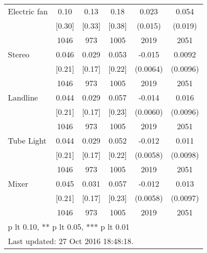 \begin{table}[htbp]
\begin{tabular*}{0.9\hsize}{@{\hskip\tabcolsep\extracolsep\fill}l*{1}{ccccc}}
Electric fan                    &     0.10&     0.13&     0.18&    0.023         &    0.054\sym{***}\\
                                &   [0.30]&   [0.33]&   [0.38]&  (0.015)         &  (0.019)         \\
                                &     1046&      973&     1005&     2019         &     2051         \\
Stereo                          &    0.046&    0.029&    0.053&   -0.015\sym{**} &   0.0092         \\
                                &   [0.21]&   [0.17]&   [0.22]& (0.0064)         & (0.0096)         \\
                                &     1046&      973&     1005&     2019         &     2051         \\
Landline                        &    0.044&    0.029&    0.057&   -0.014\sym{**} &    0.016         \\
                                &   [0.21]&   [0.17]&   [0.23]& (0.0060)         & (0.0096)         \\
                                &     1046&      973&     1005&     2019         &     2051         \\
Tube Light                      &    0.044&    0.029&    0.052&   -0.012\sym{**} &    0.011         \\
                                &   [0.21]&   [0.17]&   [0.22]& (0.0058)         & (0.0098)         \\
                                &     1046&      973&     1005&     2019         &     2051         \\
Mixer                           &    0.045&    0.031&    0.057&   -0.012\sym{**} &    0.013         \\
                                &   [0.21]&   [0.17]&   [0.23]& (0.0058)         & (0.0097)         \\
                                &     1046&      973&     1005&     2019         &     2051         \\
\bottomrule
\multicolumn{6}{l}{\footnotesize * p lt 0.10, ** p lt 0.05, *** p lt 0.01}\\
\multicolumn{6}{l}{\footnotesize Last updated: 27 Oct 2016 18:48:18.}\\
\end{tabular*}
\end{table}
